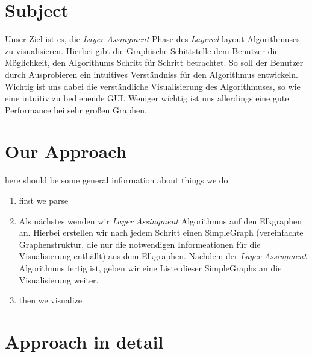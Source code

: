 \documentclass[12pt]{book}
\begin{document}
 
\section*{Subject}

Unser Ziel ist es, die  \textit{Layer Assingment} Phase des \textit{Layered} layout Algorithmuses zu visualisieren. 
Hierbei gibt die Graphische Schittstelle dem Benutzer die Möglichkeit, den Algorithums Schritt für Schritt betrachtet. 
So soll  der Benutzer durch Ausprobieren ein intuitives Verständniss für den Algorithmus entwickeln. Wichtig ist uns
dabei die verständliche Visualisierung des Algorithmuses, so wie eine intuitiv zu bedienende GUI. Weniger wichtig ist
uns allerdings eine gute Performance bei sehr großen Graphen.


\section*{Our Approach}

here should be some general information about things we do.

\begin{enumerate}
    \item first we parse
    \item Als nächstes wenden wir \textit{Layer Assingment} Algorithmus auf den Elkgraphen an. Hierbei erstellen wir nach
    jedem Schritt einen SimpleGraph (vereinfachte Graphenstruktur, die nur die notwendigen Informeationen für die
    Visualisierung enthällt) aus dem Elkgraphen. Nachdem der \textit{Layer Assingment} Algorithmus fertig ist, geben wir 
    eine Liste dieser SimpleGraphs an die Visualisierung weiter.
    \item then we visualize
\end{enumerate}


\section*{Approach in detail}

\end{document}
